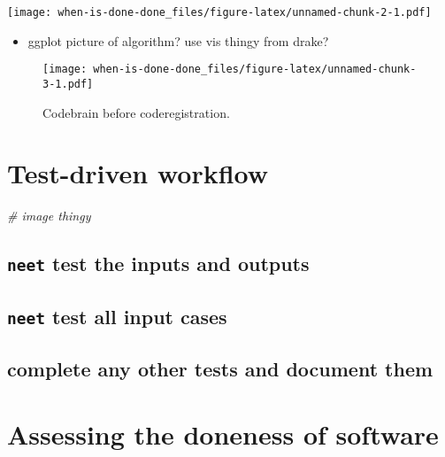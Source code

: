 \documentclass[
]{article}
\newenvironment{Shaded}{\begin{snugshade}}{\end{snugshade}}
\newcommand{\CommentTok}[1]{\textcolor[rgb]{0.56,0.35,0.01}{\textit{#1}}}
\providecommand{\tightlist}{%
  \setlength{\itemsep}{0pt}\setlength{\parskip}{0pt}}
\begin{document}
\texttt{[image: when-is-done-done\_files/figure-latex/unnamed-chunk-2-1.pdf]}

\begin{itemize}
\tightlist
\item
  ggplot picture of algorithm? use vis thingy from drake?
\end{itemize}

\begin{figure}
\centering
\texttt{[image: when-is-done-done\_files/figure-latex/unnamed-chunk-3-1.pdf]}
\caption{Codebrain before coderegistration.}
\end{figure}

\hypertarget{test-driven-workflow}{%
\section{Test-driven workflow}\label{test-driven-workflow}}

\begin{Shaded}
\begin{Highlighting}[]
\CommentTok{\# image thingy}
\end{Highlighting}
\end{Shaded}

\hypertarget{neet-test-the-inputs-and-outputs}{%
\subsection{\texorpdfstring{\texttt{neet} test the inputs and
outputs}{neet test the inputs and outputs}}\label{neet-test-the-inputs-and-outputs}}

\hypertarget{neet-test-all-input-cases}{%
\subsection{\texorpdfstring{\texttt{neet} test all input
cases}{neet test all input cases}}\label{neet-test-all-input-cases}}

\hypertarget{complete-any-other-tests-and-document-them}{%
\subsection{complete any other tests and document
them}\label{complete-any-other-tests-and-document-them}}

\hypertarget{assessing-the-doneness-of-software}{%
\section{Assessing the doneness of
software}\label{assessing-the-doneness-of-software}}
\end{document}

